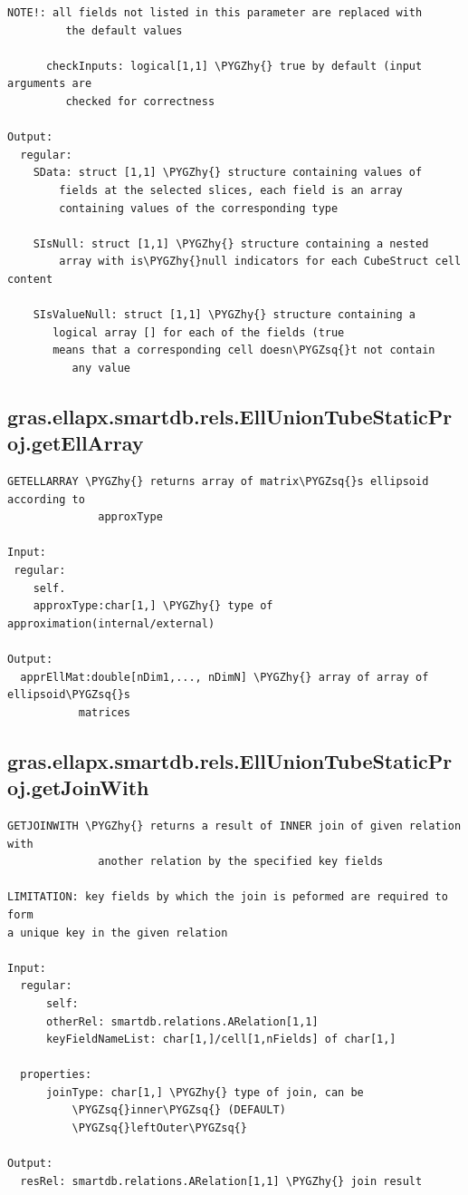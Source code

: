 \documentclass[letterpaper,10pt,english]{sphinxmanual}
\def\PYGZhy{\char`\-}
\def\PYGZsq{\char`\'}
\begin{document}
\begin{Verbatim}[commandchars=\\\{\}]
         NOTE!: all fields not listed in this parameter are replaced with
         the default values

      checkInputs: logical[1,1] \PYGZhy{} true by default (input arguments are
         checked for correctness

Output:
  regular:
    SData: struct [1,1] \PYGZhy{} structure containing values of
        fields at the selected slices, each field is an array
        containing values of the corresponding type

    SIsNull: struct [1,1] \PYGZhy{} structure containing a nested
        array with is\PYGZhy{}null indicators for each CubeStruct cell content

    SIsValueNull: struct [1,1] \PYGZhy{} structure containing a
       logical array [] for each of the fields (true
       means that a corresponding cell doesn\PYGZsq{}t not contain
          any value
\end{Verbatim}


\subsection{gras.ellapx.smartdb.rels.EllUnionTubeStaticProj.getEllArray}
\label{chap_functions:gras-ellapx-smartdb-rels-elluniontubestaticproj-getellarray}
\begin{Verbatim}[commandchars=\\\{\}]
GETELLARRAY \PYGZhy{} returns array of matrix\PYGZsq{}s ellipsoid according to
              approxType

Input:
 regular:
    self.
    approxType:char[1,] \PYGZhy{} type of approximation(internal/external)

Output:
  apprEllMat:double[nDim1,..., nDimN] \PYGZhy{} array of array of ellipsoid\PYGZsq{}s
           matrices
\end{Verbatim}


\subsection{gras.ellapx.smartdb.rels.EllUnionTubeStaticProj.getJoinWith}
\label{chap_functions:gras-ellapx-smartdb-rels-elluniontubestaticproj-getjoinwith}
\begin{Verbatim}[commandchars=\\\{\}]
GETJOINWITH \PYGZhy{} returns a result of INNER join of given relation with
              another relation by the specified key fields

LIMITATION: key fields by which the join is peformed are required to form
a unique key in the given relation

Input:
  regular:
      self:
      otherRel: smartdb.relations.ARelation[1,1]
      keyFieldNameList: char[1,]/cell[1,nFields] of char[1,]

  properties:
      joinType: char[1,] \PYGZhy{} type of join, can be
          \PYGZsq{}inner\PYGZsq{} (DEFAULT)
          \PYGZsq{}leftOuter\PYGZsq{}

Output:
  resRel: smartdb.relations.ARelation[1,1] \PYGZhy{} join result
\end{Verbatim}
\end{document}
